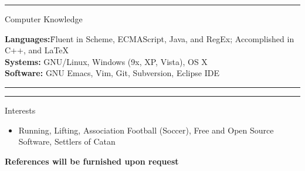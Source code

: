 \documentclass[10pt]{letter}
\begin{document}
\rule{\linewidth}{.5pt}

{\Large Computer Knowledge}
\begin{tabbing}
\textbf{Languages:}\hspace{.2in}\= Fluent in Scheme, ECMAScript,
                   Java, and RegEx; Accomplished in C++, and \LaTeX\\
\textbf{Systems:}\> GNU/Linux, Windows (9x, XP, Vista), OS X\\
\textbf{Software:}\> GNU Emacs, Vim, Git, Subversion, Eclipse IDE
\end{tabbing}\vspace{-15pt}

\rule{\linewidth}{.5pt}

\vspace{-15pt}

\rule{\linewidth}{.5pt}

{\Large Interests}\vspace{-5pt}
\begin{itemize}
\setlength\itemsep{1pt}
\item Running, Lifting, Association Football (Soccer), Free and Open Source Software, Settlers of Catan
\end{itemize}
\begin{center}\textbf{References will be furnished upon request}\end{center}
\end{document}
